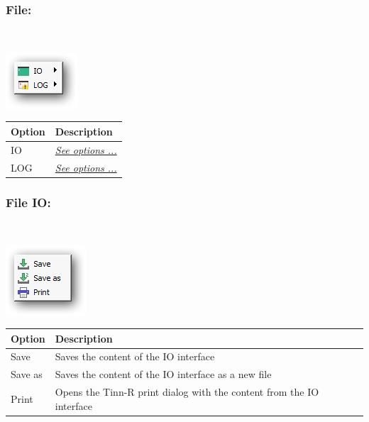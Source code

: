 \hypertarget{menu_r_term_file}{}
\subsubsection{File:}\\

\includegraphics[scale=0.50]{./res/menu_r_term_IOandLog.png}\\

\begin{scriptsize}
  \begin{tabularx}{\textwidth}{>{\hsize=0.3\hsize}X>{\hsize=0.7\hsize}X}\\
    \hline
    \textbf{Option} & \textbf{Description} \\
    \hline
    IO & \textit{\href{\#menu\_r\_term\_file\_IO}{See options ...}} \\
    LOG & \textit{\href{\#menu\_r\_term\_file\_Log}{See options ...}} \\
    \hline
  \end{tabularx}
\end{scriptsize}

\hypertarget{menu_r_term_file_IO}{}
\subsubsection{File IO:}\\

\includegraphics[scale=0.50]{./res/menu_r_term_file_IOandLog.png}\\

\begin{scriptsize}
  \begin{tabularx}{\textwidth}{>{\hsize=0.3\hsize}X>{\hsize=0.7\hsize}X}\\
    \hline
    \textbf{Option} & \textbf{Description} \\
    \hline
    Save & Saves the content of the IO interface \\
    Save as & Saves the content of the IO interface as a new file \\
    Print & Opens the Tinn-R print dialog with the content from the IO interface \\
    \hline
  \end{tabularx}
\end{scriptsize}

